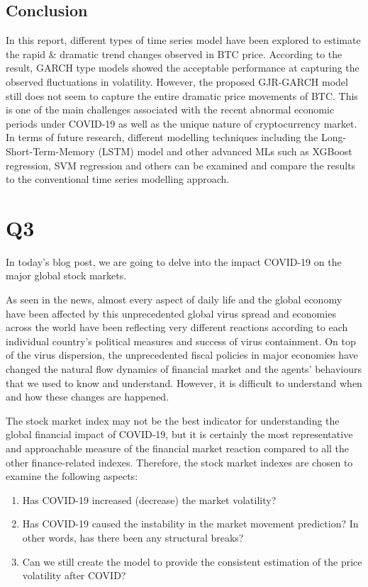 \documentclass[
  11pt,
]{article}
\providecommand{\tightlist}{%
  \setlength{\itemsep}{0pt}\setlength{\parskip}{0pt}}
\begin{document}
\hypertarget{conclusion}{%
\subsection{Conclusion}\label{conclusion}}

In this report, different types of time series model have been explored
to estimate the rapid \& dramatic trend changes observed in BTC price.
According to the result, GARCH type models showed the acceptable
performance at capturing the observed fluctuations in volatility.
However, the proposed GJR-GARCH model still does not seem to capture the
entire dramatic price movements of BTC. This is one of the main
challenges associated with the recent abnormal economic periods under
COVID-19 as well as the unique nature of cryptocurrency market. In terms
of future research, different modelling techniques including the
Long-Short-Term-Memory (LSTM) model and other advanced MLs such as
XGBoost regression, SVM regression and others can be examined and
compare the results to the conventional time series modelling approach.

\hypertarget{q3}{%
\section{Q3}\label{q3}}

In today's blog post, we are going to delve into the impact COVID-19 on
the major global stock markets.

As seen in the news, almost every aspect of daily life and the global
economy have been affected by this unprecedented global virus spread and
economies across the world have been reflecting very different reactions
according to each individual country's political measures and success of
virus containment. On top of the virus dispersion, the unprecedented
fiscal policies in major economies have changed the natural flow
dynamics of financial market and the agents' behaviours that we used to
know and understand. However, it is difficult to understand when and how
these changes are happened.

The stock market index may not be the best indicator for understanding
the global financial impact of COVID-19, but it is certainly the most
representative and approachable measure of the financial market reaction
compared to all the other finance-related indexes. Therefore, the stock
market indexes are chosen to examine the following aspects:

\begin{enumerate}
\def\labelenumi{\arabic{enumi}.}
\tightlist
\item
  Has COVID-19 increased (decrease) the market volatility?
\item
  Has COVID-19 caused the instability in the market movement prediction?
  In other words, has there been any structural breaks?
\item
  Can we still create the model to provide the consistent estimation of
  the price volatility after COVID?
\end{enumerate}
\end{document}
